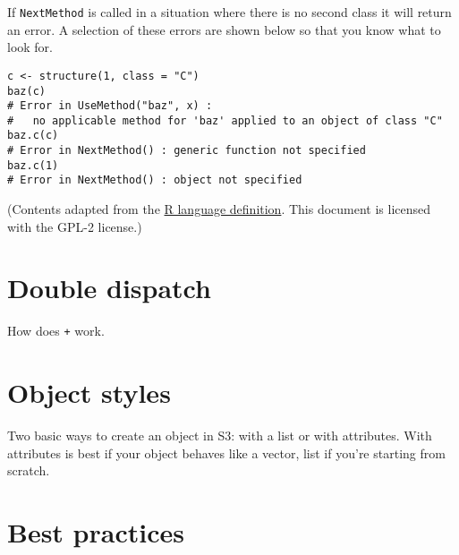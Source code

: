 If \texttt{NextMethod} is called in a situation where there is no second
class it will return an error. A selection of these errors are shown
below so that you know what to look for.

\begin{verbatim}
c <- structure(1, class = "C")
baz(c)
# Error in UseMethod("baz", x) : 
#   no applicable method for 'baz' applied to an object of class "C"
baz.c(c)
# Error in NextMethod() : generic function not specified
baz.c(1)
# Error in NextMethod() : object not specified
\end{verbatim}

(Contents adapted from the
\href{http://cran.r-project.org/doc/manuals/R-lang.html\#Object_002doriented-programming}{R
language definition}. This document is licensed with the GPL-2 license.)

\section{Double dispatch}

How does \texttt{+} work.

\section{Object styles}

Two basic ways to create an object in S3: with a list or with
attributes. With attributes is best if your object behaves like a
vector, list if you're starting from scratch.

\section{Best practices}

